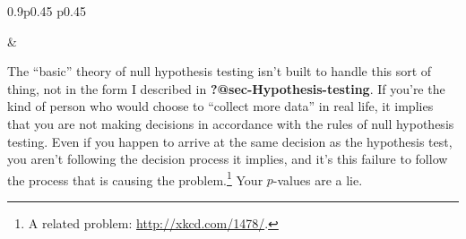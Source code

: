 \documentclass[
  a4paper,
]{book}
\begin{document}
\begin{table}[ht]
\begin{centerbox}
\begin{threeparttable}
\begin{tabularx}{0.9\textwidth}{p{} p{}}
\hhline{}

 &
 \tabularnewline[-0.5pt]


\end{tabularx} 

\end{threeparttable}\par\end{centerbox}

\end{table}
 

The ``basic'' theory of null hypothesis testing isn't built to handle
this sort of thing, not in the form I described in
\textbf{?@sec-Hypothesis-testing}. If you're the kind of person who
would choose to ``collect more data'' in real life, it implies that you
are not making decisions in accordance with the rules of null hypothesis
testing. Even if you happen to arrive at the same decision as the
hypothesis test, you aren't following the decision process it implies,
and it's this failure to follow the process that is causing the
problem.\footnote{A related problem: \url{http://xkcd.com/1478/}.} Your
\(p\)-values are a lie.
\end{document}
